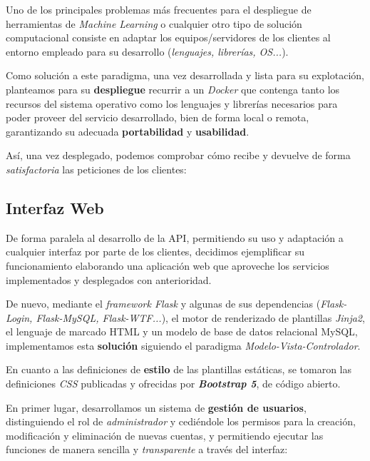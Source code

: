 Uno de los principales problemas más frecuentes para el despliegue de herramientas de \textit{Machine Learning} o cualquier otro tipo de solución computacional consiste en adaptar los equipos/servidores de los clientes al entorno empleado para su desarrollo (\textit{lenguajes, librerías, OS...}). 

Como solución a este paradigma, una vez desarrollada y lista para su explotación, planteamos para su \textbf{despliegue} recurrir a un \textit{Docker} \cite{Merkel2014Docker:Deployment} que contenga tanto los recursos del sistema operativo como los lenguajes y librerías necesarios para poder proveer del servicio desarrollado, bien de forma local o remota, garantizando su adecuada \textbf{portabilidad} y \textbf{usabilidad}.

Así, una vez desplegado, podemos comprobar cómo recibe y devuelve de forma \textit{satisfactoria} las peticiones de los clientes:


\subsection{Interfaz Web}

De forma paralela al desarrollo de la API, permitiendo su uso y adaptación a cualquier interfaz por parte de los clientes, decidimos ejemplificar su funcionamiento elaborando una aplicación web que aproveche los servicios implementados y desplegados con anterioridad.

De nuevo, mediante el \textit{framework Flask} y algunas de sus dependencias (\textit{Flask-Login, Flask-MySQL, Flask-WTF...}), el motor de renderizado de plantillas \textit{Jinja2}, el lenguaje de marcado HTML y un modelo de base de datos relacional MySQL, implementamos esta \textbf{solución} siguiendo el paradigma \textit{Modelo-Vista-Controlador}.

En cuanto a las definiciones de \textbf{estilo} de las plantillas estáticas, se tomaron las definiciones \textit{CSS} publicadas y ofrecidas por \textit{\textbf{Bootstrap 5}}, de código abierto.

En primer lugar, desarrollamos un sistema de \textbf{gestión de usuarios}, distinguiendo el rol de \textit{administrador} y cediéndole los permisos para la creación, modificación y eliminación de nuevas cuentas, y permitiendo ejecutar las funciones de manera sencilla y \textit{transparente} a través del interfaz:

